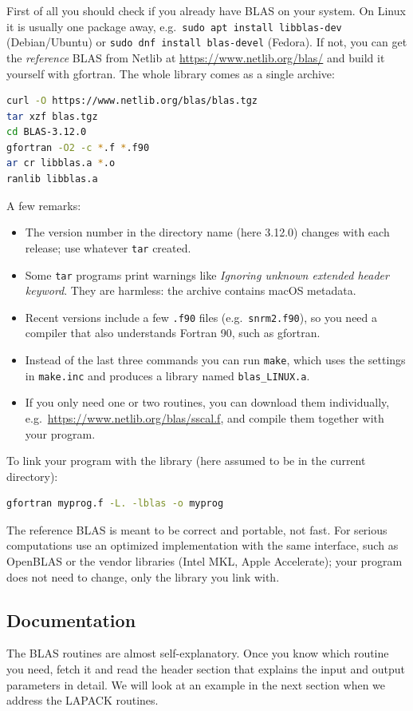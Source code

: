 First of all you should check if you already have BLAS on your system. On Linux it is usually one package away, e.g.\ \texttt{sudo apt install libblas-dev} (Debian/Ubuntu) or \texttt{sudo dnf install blas-devel} (Fedora). If not, you can get the \emph{reference} BLAS from Netlib at \url{https://www.netlib.org/blas/} and build it yourself with gfortran. The whole library comes as a single archive:

\begin{lstlisting}[language=bash,basicstyle=\ttfamily\small,columns=fullflexible]
curl -O https://www.netlib.org/blas/blas.tgz
tar xzf blas.tgz
cd BLAS-3.12.0
gfortran -O2 -c *.f *.f90
ar cr libblas.a *.o
ranlib libblas.a
\end{lstlisting}

A few remarks:

\begin{itemize}
    \item The version number in the directory name (here 3.12.0) changes with each release; use whatever \texttt{tar} created.
    \item Some \texttt{tar} programs print warnings like \emph{Ignoring unknown extended header keyword}. They are harmless: the archive contains macOS metadata.
    \item Recent versions include a few \texttt{.f90} files (e.g.\ \texttt{snrm2.f90}), so you need a compiler that also understands Fortran 90, such as gfortran.
    \item Instead of the last three commands you can run \texttt{make}, which uses the settings in \texttt{make.inc} and produces a library named \texttt{blas\_LINUX.a}.
    \item If you only need one or two routines, you can download them individually, e.g.\ \url{https://www.netlib.org/blas/sscal.f}, and compile them together with your program.
\end{itemize}

To link your program with the library (here assumed to be in the current directory):

\begin{lstlisting}[language=bash,basicstyle=\ttfamily\small,columns=fullflexible]
gfortran myprog.f -L. -lblas -o myprog
\end{lstlisting}

The reference BLAS is meant to be correct and portable, not fast. For serious computations use an optimized implementation with the same interface, such as OpenBLAS or the vendor libraries (Intel MKL, Apple Accelerate); your program does not need to change, only the library you link with.

\subsection{Documentation}

The BLAS routines are almost self-explanatory. Once you know which routine you need, fetch it and read the header section that explains the input and output parameters in detail. We will look at an example in the next section when we address the LAPACK routines.
